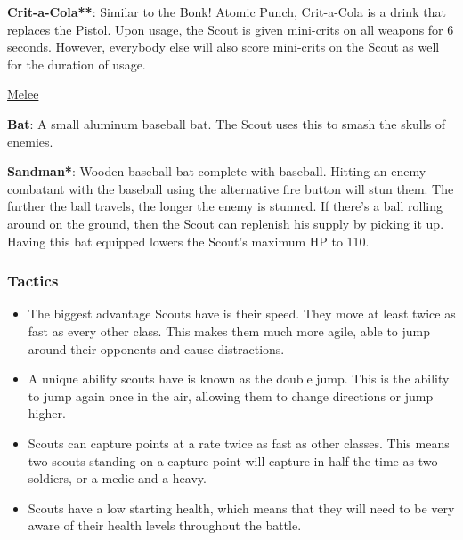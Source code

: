 {\bf Crit-a-Cola**}: Similar to the Bonk! Atomic Punch, Crit-a-Cola is a drink that replaces the Pistol.  Upon usage, the Scout is given mini-crits on all weapons for 6 seconds.  However, everybody else will also score mini-crits on the Scout as well for the duration of usage.

\newpage


\begin {center}
\underline {Melee}
\end {center}

{\bf Bat}: A small aluminum baseball bat. The Scout uses this to smash the skulls of enemies. 

{\bf Sandman*}: Wooden baseball bat complete with baseball. Hitting an enemy combatant with the baseball using the alternative fire button will stun them. The further the ball travels, the longer the enemy is stunned. If there's a ball rolling around on the ground, then the Scout can replenish his supply by picking it up. Having this bat equipped lowers the Scout’s maximum HP to 110. 

\subsubsection {Tactics}
\begin {itemize}
\item The biggest advantage Scouts have is their speed. They move at least twice as fast as every other class.  This makes them much more agile, able to jump around their opponents and cause distractions.

\item A unique ability scouts have is known as the double jump.  This is the ability to jump again once in the air, allowing them to change directions or jump higher.

\item Scouts can capture points at a rate twice as fast as other classes.  This means two scouts standing on a capture point will capture in half the time as two soldiers, or a medic and a heavy.

\item Scouts have a low starting health, which means that they will need to be very aware of their health levels throughout the battle.  
\end {itemize}